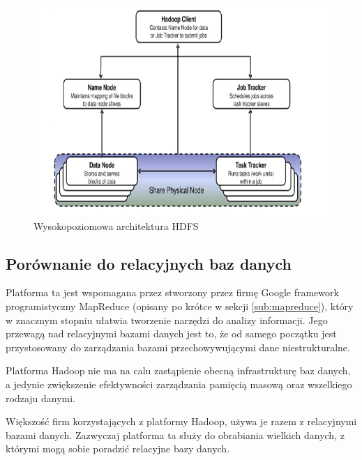 \documentclass[10pt,twocolumn]{llncs}          %
\begin{document}
\begin{figure}
    \centerline{\includegraphics[scale=0.4]{obrazki/wysokopoziomowa_architektura_hadoop.png}}
    \caption{Wysokopoziomowa architektura HDFS}
    \label{fig:hdfs_hight_level_architecture}       %
\end{figure}


\subsection{Porównanie do relacyjnych baz danych}
\label{ssub:porownanie_z_relacyjnymi}
Platforma ta jest wspomagana przez stworzony przez firmę Google framework programistyczny MapReduce (opisany po krótce w sekcji \ref{sub:mapreduce}), który w znacznym stopniu ułatwia tworzenie narzędzi do analizy informacji. Jego przewagą nad relacyjnymi bazami danych jest to, że od samego początku jest przystosowany do zarządzania bazami przechowywującymi dane niestrukturalne.

Platforma Hadoop nie ma na calu zastąpienie obecną infrastrukturę baz danych, a jedynie zwiększenie efektywności zarządzania pamięcią masową oraz wszelkiego rodzaju danymi.

Większość firm korzystających z platformy Hadoop, używa je razem z relacyjnymi bazami danych. Zazwyczaj platforma ta służy do obrabiania wielkich danych, z którymi mogą sobie poradzić relacyjne bazy danych.
\end{document}
